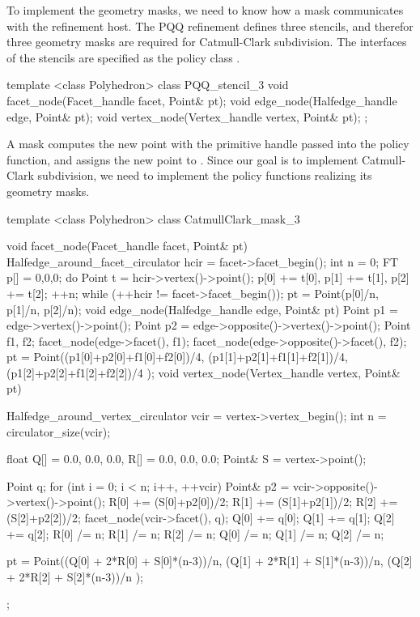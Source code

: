 To implement the geometry masks, we need to know how  
a mask communicates with the refinement host. The PQQ refinement 
defines three stencils, and therefor three geometry masks
are required for Catmull-Clark subdivision.
The interfaces of the stencils are specified as
the policy class .

\begin{ccExampleCode}
template <class Polyhedron>
class PQQ_stencil_3 {
  void facet_node(Facet_handle facet, Point& pt);
  void edge_node(Halfedge_handle edge, Point& pt);
  void vertex_node(Vertex_handle vertex, Point& pt);
};
\end{ccExampleCode}

A mask computes the new point with the primitive handle
passed into the policy function, and assigns the new point to
. Since our goal is to implement Catmull-Clark 
subdivision, we need to implement the policy functions realizing
its geometry masks. 

\begin{ccExampleCode}
template <class Polyhedron>
class CatmullClark_mask_3 {
  void facet_node(Facet_handle facet, Point& pt) {
    Halfedge_around_facet_circulator hcir = facet->facet_begin();
    int n = 0;
    FT p[] = {0,0,0};
    do {
      Point t = hcir->vertex()->point();
      p[0] += t[0], p[1] += t[1], p[2] += t[2]; 
      ++n;
    } while (++hcir != facet->facet_begin());
    pt = Point(p[0]/n, p[1]/n, p[2]/n);
  }
  void edge_node(Halfedge_handle edge, Point& pt) {
    Point p1 = edge->vertex()->point();
    Point p2 = edge->opposite()->vertex()->point();
    Point f1, f2;
    facet_node(edge->facet(), f1);
    facet_node(edge->opposite()->facet(), f2);
    pt = Point((p1[0]+p2[0]+f1[0]+f2[0])/4,
               (p1[1]+p2[1]+f1[1]+f2[1])/4,
               (p1[2]+p2[2]+f1[2]+f2[2])/4 );
  }
  void vertex_node(Vertex_handle vertex, Point& pt) {
    Halfedge_around_vertex_circulator vcir = vertex->vertex_begin();
    int n = circulator_size(vcir);    

    float Q[] = {0.0, 0.0, 0.0}, R[] = {0.0, 0.0, 0.0};
    Point& S = vertex->point();
    
    Point q;
    for (int i = 0; i < n; i++, ++vcir) {
      Point& p2 = vcir->opposite()->vertex()->point();
      R[0] += (S[0]+p2[0])/2;
      R[1] += (S[1]+p2[1])/2;
      R[2] += (S[2]+p2[2])/2;
      facet_node(vcir->facet(), q);
      Q[0] += q[0];      
      Q[1] += q[1];      
      Q[2] += q[2];
    }
    R[0] /= n;    R[1] /= n;    R[2] /= n;
    Q[0] /= n;    Q[1] /= n;    Q[2] /= n;
      
    pt = Point((Q[0] + 2*R[0] + S[0]*(n-3))/n,
               (Q[1] + 2*R[1] + S[1]*(n-3))/n,
               (Q[2] + 2*R[2] + S[2]*(n-3))/n );
  }
};
\end{ccExampleCode}

